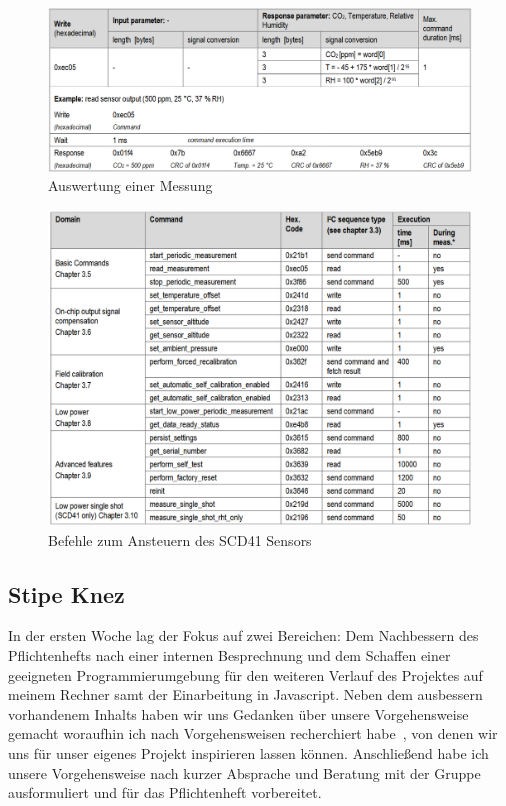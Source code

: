 \documentclass[]{article}
\begin{document}
\begin{figure}[!h]
	\centering
	\includegraphics[scale=0.40]{images/scd41_umrechnung}
	\caption{Auswertung einer Messung ~\cite{datasheetscd41}}
	\label{img:scd41_umrechnung}
\end{figure}
\begin{figure}[!h]
	\centering
	\includegraphics[scale=0.40]{images/scd41_commandset}
	\caption{Befehle zum Ansteuern des SCD41 Sensors~\cite{datasheetsht21}}
	\label{img:scd41_commandset}
\end{figure}


\subsection{Stipe Knez}
In der ersten  Woche lag der Fokus auf zwei Bereichen: Dem Nachbessern des Pflichtenhefts nach einer internen Besprechnung und dem Schaffen einer geeigneten Programmierumgebung für den weiteren Verlauf des Projektes auf meinem Rechner samt der Einarbeitung in Javascript.
Neben dem ausbessern vorhandenem Inhalts haben wir uns Gedanken über unsere Vorgehensweise gemacht woraufhin ich nach Vorgehensweisen recherchiert habe~\cite{scrum}, von denen wir uns für unser eigenes Projekt inspirieren lassen können. Anschließend habe ich unsere Vorgehensweise nach kurzer Absprache und Beratung mit der Gruppe ausformuliert und für das Pflichtenheft vorbereitet.
\end{document}
